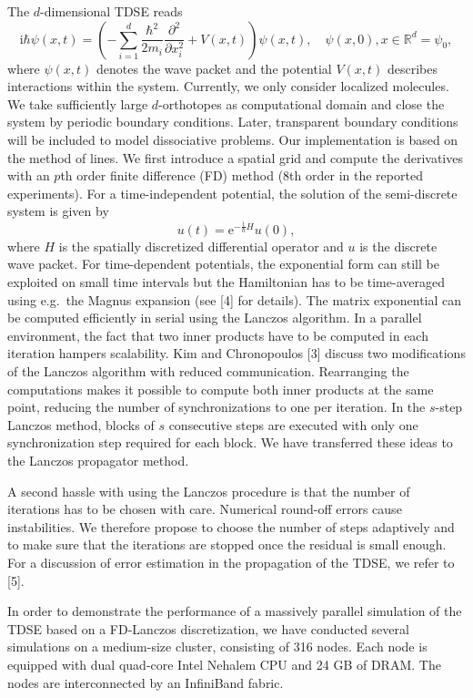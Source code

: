 \documentclass{report}
\begin{document}
The $d$-dimensional TDSE reads
\begin{equation*}
\mathrm{i}\hbar \psi(x,t) = \left(-
\sum_{i=1}^d\frac{\hbar^2}{2m_i}\frac{\partial^2}{\partial x_i^2} +
V(x,t)\right)\psi(x,t), \quad \psi(x,0), x \in \mathbb{R}^d = \psi_0,
\end{equation*}
where $\psi(x,t)$ denotes the wave packet and the potential $V(x,t)$
describes interactions within the system. Currently, we only consider
localized molecules. We take sufficiently large $d$-orthotopes as
computational domain and close the system by periodic boundary
conditions. Later, transparent boundary conditions will be included to
model dissociative problems. Our implementation is based on the method of
lines. We first introduce a spatial grid and compute the derivatives with
an $p$th order finite difference (FD) method (8th order in the reported
experiments). For a time-independent potential, the solution of the
semi-discrete system is given by
\begin{equation*}
u(t) = \mathrm{e}^{-\frac{\mathrm{i}}{\hbar} H}u(0),
\end{equation*}
where $H$ is the spatially discretized differential operator and $u$ is
the discrete wave packet. For time-dependent potentials, the exponential
form can still be exploited on small time intervals but the Hamiltonian
has to be time-averaged using e.g.~the Magnus expansion (see [4] for
details). The matrix exponential can be computed efficiently in serial
using the Lanczos algorithm. In a parallel environment, the fact that two
inner products have to be computed in each iteration hampers scalability.
Kim and Chronopoulos [3] discuss two modifications of the Lanczos
algorithm with reduced communication. Rearranging the computations makes
it possible to compute both inner products at the same point, reducing
the number of synchronizations to one per iteration. In the $s$-step
Lanczos method, blocks of $s$ consecutive steps are executed with only
one synchronization step required for each block. We have transferred
these ideas to the Lanczos propagator method.

A second hassle with using the Lanczos procedure is that the number of
iterations has to be chosen with care. Numerical round-off errors cause
instabilities. We therefore propose to choose the number of steps
adaptively and to make sure that the iterations are stopped once the
residual is small enough. For a discussion of error estimation in the
propagation of the TDSE, we refer to [5].

In order to demonstrate the performance of a massively parallel
simulation of the TDSE based on a FD-Lanczos discretization, we have
conducted several simulations on a medium-size cluster, consisting of 316
nodes. Each node is equipped with dual quad-core Intel Nehalem CPU and 24
GB of DRAM. The nodes are interconnected by an InfiniBand fabric.
\end{document}
